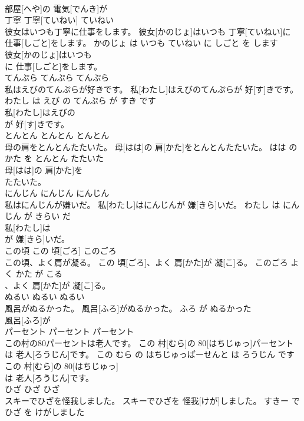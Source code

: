\documentclass[8pt]{extreport}
\begin{document}
\begin{CJK}{UTF8}{min}
\\	部屋[へや]の 電気[でんき]が
\\	丁寧	丁寧[ていねい]	ていねい	
\\	彼女はいつも丁寧に仕事をします。	彼女[かのじょ]はいつも 丁寧[ていねい]に 仕事[しごと]をします。	かのじょ は いつも ていねい に しごと を します	
\\	彼女[かのじょ]はいつも
\\	に 仕事[しごと]をします。			
\\	てんぷら	てんぷら	てんぷら	
\\	私はえびのてんぷらが好きです。	私[わたし]はえびのてんぷらが 好[す]きです。	わたし は えび の てんぷら が すき です	
\\	私[わたし]はえびの
\\	が 好[す]きです。			
\\	とんとん	とんとん	とんとん	
\\	母の肩をとんとんたたいた。	母[はは]の 肩[かた]をとんとんたたいた。	はは の かた を とんとん たたいた	
\\	母[はは]の 肩[かた]を
\\	たたいた。			
\\	にんじん	にんじん	にんじん	
\\	私はにんじんが嫌いだ。	私[わたし]はにんじんが 嫌[きら]いだ。	わたし は にんじん が きらい だ	
\\	私[わたし]は
\\	が 嫌[きら]いだ。			
\\	この頃	この 頃[ごろ]	このごろ	
\\	この頃、よく肩が凝る。	この 頃[ごろ]、よく 肩[かた]が 凝[こ]る。	このごろ よく かた が こる	
\\	、よく 肩[かた]が 凝[こ]る。			
\\	ぬるい	ぬるい	ぬるい	
\\	風呂がぬるかった。	風呂[ふろ]がぬるかった。	ふろ が ぬるかった	
\\	風呂[ふろ]が
\\	パーセント	パーセント	パーセント	
\\	この村の80パーセントは老人です。	この 村[むら]の 80[はちじゅっ]パーセントは 老人[ろうじん]です。	この むら の はちじゅっぱーせんと は ろうじん です	
\\	この 村[むら]の 80[はちじゅっ]
\\	は 老人[ろうじん]です。			
\\	ひざ	ひざ	ひざ	
\\	スキーでひざを怪我しました。	スキーでひざを 怪我[けが]しました。	すきー で ひざ を けがしました	

\end{CJK}
\end{document}
